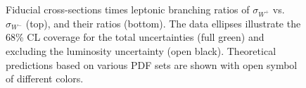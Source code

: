 \begin{figure}[phtb]
  \begin{center}
\caption{ Fiducial cross-sections times leptonic branching ratios of $\sigma_{W^+}$ vs. $\sigma_{W^-}$ (top), and their ratios (bottom).
The data ellipses illustrate the 68\% CL coverage for the total uncertainties (full green) and excluding the luminosity uncertainty (open black).
Theoretical predictions based on various PDF sets are shown with open symbol of different colors.
}
\label{Fig:IntFidCrossSections}
 \end{center}
\end{figure}


